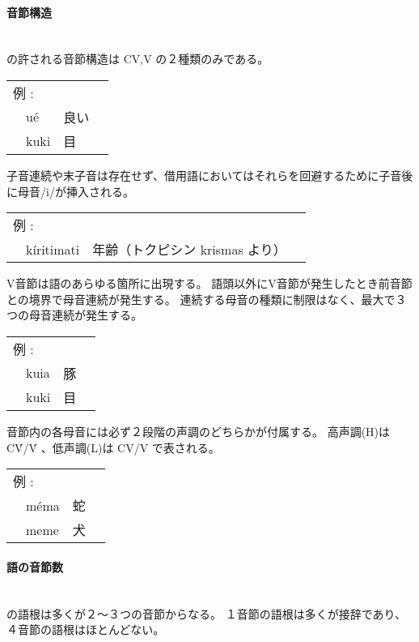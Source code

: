 \paragraph{音節構造}\quad\\
\langname の許される音節構造は CV,V の２種類のみである。

\begin{tabular}{llll}
    \multicolumn{2}{l}{例 : } \\ 
    & u\'e & 良い \\
    & kuki & 目 \\
\end{tabular}

子音連続や末子音は存在せず、借用語においてはそれらを回避するために子音後に母音/i/が挿入される。

\begin{tabular}{llll}
    \multicolumn{2}{l}{例 : } \\ 
    & k\'iritimati & 年齢（トクピシン krismas より） \\
\end{tabular}

V音節は語のあらゆる箇所に出現する。
語頭以外にV音節が発生したとき前音節との境界で母音連続が発生する。
連続する母音の種類に制限はなく、最大で３つの母音連続が発生する。

\begin{tabular}{llll}
    \multicolumn{2}{l}{例 : } \\ 
    & kuia & 豚 \\
    & kuki & 目 \\
\end{tabular}

音節内の各母音には必ず２段階の声調のどちらかが付属する。
高声調(H)は C\'V/\'V 、低声調(L)は CV/V で表される。

\begin{tabular}{llll}
    \multicolumn{2}{l}{例 : } \\ 
    & m\'ema & 蛇 \\
    & meme & 犬 \\
\end{tabular}

\paragraph{語の音節数}\quad\\
\langname の語根は多くが２～３つの音節からなる。
１音節の語根は多くが接辞であり、４音節の語根はほとんどない。

